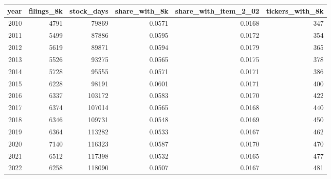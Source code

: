 \begin{tabular}{rrrrrr}
\toprule
year & filings\_8k & stock\_days & share\_with\_8k & share\_with\_item\_2\_02 & tickers\_with\_8k \\
\midrule
2010 & 4791 & 79869 & 0.0571 & 0.0168 & 347 \\
2011 & 5499 & 87886 & 0.0595 & 0.0172 & 354 \\
2012 & 5619 & 89871 & 0.0594 & 0.0179 & 365 \\
2013 & 5526 & 93275 & 0.0565 & 0.0175 & 378 \\
2014 & 5728 & 95555 & 0.0571 & 0.0171 & 386 \\
2015 & 6228 & 98191 & 0.0601 & 0.0171 & 400 \\
2016 & 6337 & 103172 & 0.0583 & 0.0170 & 422 \\
2017 & 6374 & 107014 & 0.0565 & 0.0168 & 440 \\
2018 & 6346 & 109731 & 0.0548 & 0.0169 & 450 \\
2019 & 6364 & 113282 & 0.0533 & 0.0167 & 462 \\
2020 & 7140 & 116323 & 0.0587 & 0.0170 & 470 \\
2021 & 6512 & 117398 & 0.0532 & 0.0165 & 477 \\
2022 & 6258 & 118090 & 0.0507 & 0.0167 & 481 \\
\bottomrule
\end{tabular}
